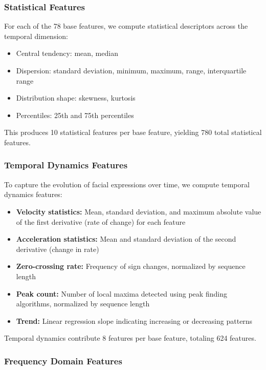 \documentclass[11pt,a4paper]{article}
\begin{document}
\subsubsection{Statistical Features}

For each of the 78 base features, we compute statistical descriptors across the temporal dimension:

\begin{itemize}
  \item Central tendency: mean, median
  \item Dispersion: standard deviation, minimum, maximum, range, interquartile range
  \item Distribution shape: skewness, kurtosis
  \item Percentiles: 25th and 75th percentiles
\end{itemize}

This produces 10 statistical features per base feature, yielding 780 total statistical features.

\subsubsection{Temporal Dynamics Features}

To capture the evolution of facial expressions over time, we compute temporal dynamics features:

\begin{itemize}
  \item \textbf{Velocity statistics:} Mean, standard deviation, and maximum absolute value of the first derivative (rate of change) for each feature
  \item \textbf{Acceleration statistics:} Mean and standard deviation of the second derivative (change in rate)
  \item \textbf{Zero-crossing rate:} Frequency of sign changes, normalized by sequence length
  \item \textbf{Peak count:} Number of local maxima detected using peak finding algorithms, normalized by sequence length
  \item \textbf{Trend:} Linear regression slope indicating increasing or decreasing patterns
\end{itemize}

Temporal dynamics contribute 8 features per base feature, totaling 624 features.

\subsubsection{Frequency Domain Features}
\end{document}
